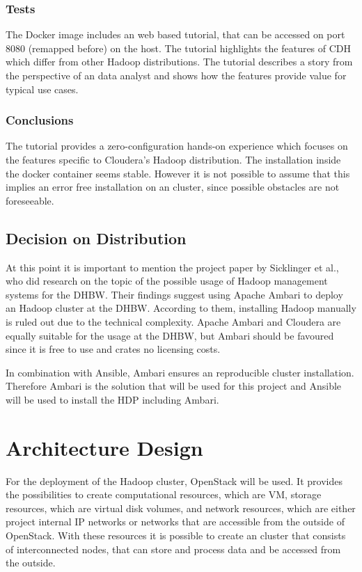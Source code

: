 \subsubsection{Tests}
The Docker image includes an web based tutorial, 
that can be accessed on port 8080 (remapped before) on the host.
The tutorial highlights the features of \ac{CDH} which differ from other Hadoop distributions.
The tutorial describes a story from the perspective of an data analyst and shows how the features provide value for typical use cases.

\subsubsection{Conclusions}
The tutorial provides a zero-configuration hands-on experience which focuses on the features specific to Cloudera's Hadoop distribution.
The installation inside the docker container seems stable.
However it is not possible to assume that this implies an error free installation on an cluster, 
since possible obstacles are not foreseeable.

\subsection{Decision on Distribution}
\label{sec:decision}

At this point it is important to mention the project paper by Sicklinger et al., 
who did research on the topic of the possible usage of Hadoop management systems for the \ac{DHBW}.
Their findings suggest using Apache Ambari to deploy an Hadoop cluster at the \ac{DHBW}.
According to them, installing Hadoop manually is ruled out due to the technical complexity.
Apache Ambari and Cloudera are equally suitable for the usage at the \ac{DHBW}, 
but Ambari should be favoured since it is free to use and crates no licensing costs.
\autocite[][p. 53f]{wi2018managementsystems}

In combination with Ansible, Ambari ensures an reproducible cluster installation. 
Therefore Ambari is the solution that will be used for this project and Ansible will be used to install the \ac{HDP} including Ambari.

\section{Architecture Design}

For the deployment of the Hadoop cluster, OpenStack will be used.
It provides the possibilities to create computational resources, which are \acs{VM}, 
storage resources, which are virtual disk volumes, 
and network resources, which are either project internal \ac{IP} networks or networks that are accessible from the outside of OpenStack.
With these resources it is possible to create an cluster that consists of interconnected nodes, 
that can store and process data and be accessed from the outside.

